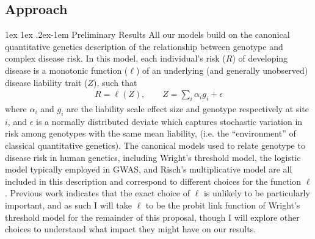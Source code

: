 \documentclass[11pt]{article}
\makeatletter
\renewcommand{\paragraph}{%
  \@startsection{paragraph}{4}%
  {\z@}{1ex \@plus 1ex \@minus .2ex}{-1em}%
  {\normalfont\normalsize\bfseries}%
}
\makeatother
\begin{document}


\setlength{\abovedisplayskip}{4pt}
\setlength{\belowdisplayskip}{4pt}

\subsection*{Approach}
\paragraph{Preliminary Results}
All our models build on the canonical quantitative genetics description of the relationship between genotype and complex disease risk. In this model, each individual's risk ($R$) of developing disease is a monotonic function ($\ell$) of an underlying (and generally unobserved) disease liability trait ($Z$), such that
\begin{align}
  R=\ell(Z),    \qquad    Z = \sum_{i}\alpha_ig_i + \epsilon
\end{align}
where $\alpha_i$ and $g_i$ are the liability scale effect size and genotype respectively at site $i$, and $\epsilon$ is a normally distributed deviate which captures stochastic variation in risk among genotypes with the same mean liability, (i.e. the ``environment'' of classical quantitative genetics). The canonical models used to relate genotype to disease risk in human genetics, including Wright's threshold model\cite{Wright:1934wd,Lush:1948vc,FalconerAndMcKay,Falconer:1965bn}, the logistic model typically employed in GWAS\cite{Risch:1996ub}, and Risch's multiplicative model \cite{Risch:1990ty} are all included in this description and correspond to different choices for the function $\ell$. Previous work \cite{Slatkin:2008hw, Wray:2010ir} indicates that the exact choice of $\ell$ is unlikely to be particularly important, and as such I will take $\ell$ to be the probit link function of Wright's threshold model for the remainder of this proposal, though I will explore other choices to understand what impact they might have on our results.
\end{document}
